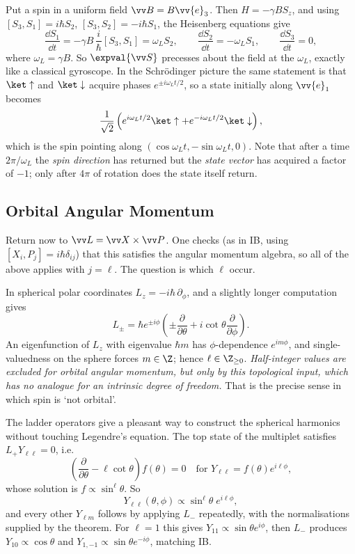 \begin{example}
    Put a spin in a uniform field $\vv B = B\vv{e}_3$. Then $H = -\gamma B S_z$, and using $[S_3,S_1] = i\hbar S_2$, $[S_3,S_2] = -i\hbar S_1$, the Heisenberg equations give
    $$
    \frac{\dd S_1}{\dd t} = -\gamma B\,\frac{i}{\hbar}[S_3, S_1] = \omega_L S_2, \qquad \frac{\dd S_2}{\dd t} = -\omega_L S_1, \qquad \frac{\dd S_3}{\dd t} = 0,
    $$
    where $\omega_L = \gamma B$. So $\expval{\vv S}$ precesses about the field at the  $\omega_L$, exactly like a classical gyroscope. In the Schr\"odinger picture the same statement is that $\ket\uparrow$ and $\ket\downarrow$ acquire phases $e^{\pm i\omega_L t/2}$, so a state initially along $\vv{e}_1$ becomes
    $$
    \frac{1}{\sqrt2}\left( e^{i\omega_L t/2}\ket\uparrow + e^{-i\omega_L t /2}\ket\downarrow \right),
    $$
    which is the spin pointing along $(\cos\omega_L t, -\sin\omega_L t, 0)$. Note that after a time $2\pi/\omega_L$ the \emph{spin direction} has returned but the \emph{state vector} has acquired a factor of $-1$; only after $4\pi$ of rotation does the state itself return.
\end{example}

\subsection{Orbital Angular Momentum}\label{sec:orbital}

Return now to $\vv L = \vv X \times \vv P$. One checks (as in IB, using $[X_i,P_j]=i\hbar\delta_{ij}$) that this satisfies the angular momentum algebra, so all of the above applies with $j = \ell$. The question is which $\ell$ occur.

In spherical polar coordinates $L_z = -i\hbar\,\partial_\phi$, and a slightly longer computation gives
$$
L_\pm = \hbar e^{\pm i \phi}\left( \pm \frac{\partial}{\partial\theta} + i \cot\theta \frac{\partial}{\partial\phi} \right).
$$
An eigenfunction of $L_z$ with eigenvalue $\hbar m$ has $\phi$-dependence $e^{im\phi}$, and single-valuedness on the sphere forces $m \in \Z$; hence $\ell \in \Z_{\geq0}$. \emph{Half-integer values are excluded for orbital angular momentum, but only by this topological input, which has no analogue for an intrinsic degree of freedom.} That is the precise sense in which spin is `not orbital'.

The ladder operators give a pleasant way to construct the spherical harmonics without touching Legendre's equation. The top state of the multiplet satisfies $L_+Y_{\ell\ell} = 0$, i.e.
$$
\left( \frac{\partial}{\partial\theta} - \ell\cot\theta \right) f(\theta) = 0 \quad \text{for } Y_{\ell\ell} = f(\theta)e^{i\ell\phi},
$$
whose solution is $f \propto \sin^\ell\theta$. So
$$
Y_{\ell\ell}(\theta,\phi) \propto \sin^\ell\theta \; e^{i\ell\phi},
$$
and every other $Y_{\ell m}$ follows by applying $L_-$ repeatedly, with the normalisations supplied by the theorem. For $\ell=1$ this gives $Y_{11}\propto \sin\theta e^{i\phi}$, then $L_-$ produces $Y_{10}\propto\cos\theta$ and $Y_{1,-1}\propto \sin\theta e^{-i\phi}$, matching IB.

